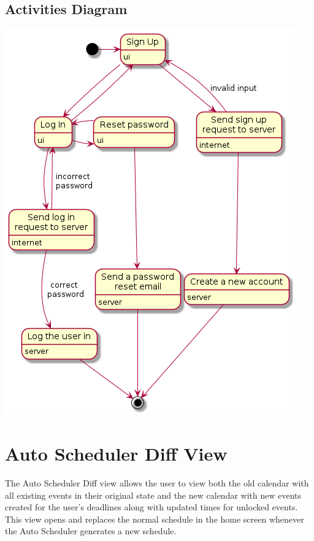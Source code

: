 \documentclass{scrreprt}
\begin{document}
\subsection{Activities Diagram}
\begin{center}
\includegraphics[scale=0.7]{accmanage.png}
\end{center}

\section{Auto Scheduler Diff View}
The Auto Scheduler Diff view allows the user to view both the old calendar with all existing events in their original state and the new calendar with new events created for the user's deadlines along with updated times for unlocked events.\\
This view opens and replaces the normal schedule in the home screen whenever the Auto Scheduler generates a new schedule.
\end{document}
